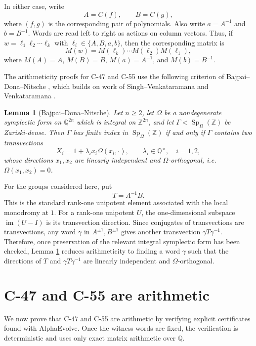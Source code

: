 \documentclass[11pt]{article}
\newtheorem{lemma}{Lemma}
\DeclareMathOperator{\Sp}{Sp}
\newcommand{\ZZ}{\mathbb{Z}}
\newcommand{\QQ}{\mathbb{Q}}
\begin{document}
In either case, write
\[
  A=C(f),\qquad B=C(g),
\]
where $(f,g)$ is the corresponding pair of polynomials.  Also write
$a=A^{-1}$ and $b=B^{-1}$.  Words are read left to right as actions on column
vectors.  Thus, if $w=\ell_1\ell_2\cdots\ell_k$ with
$\ell_i\in\{A,B,a,b\}$, then the corresponding matrix is
\[
  M(w)=M(\ell_k)\cdots M(\ell_2)M(\ell_1),
\]
where $M(A)=A$, $M(B)=B$, $M(a)=A^{-1}$, and $M(b)=B^{-1}$.

The arithmeticity proofs for C-47 and C-55 use the following criterion of Bajpai--Dona--Nitsche
\cite[Lemma 1]{BajpaiDonaNitsche2026Arithmetic}, which builds on work of
Singh--Venkataramana \cite{SinghVenkataramana2014Arithmeticity} and
Venkataramana \cite{Venkataramana1987Zariskidensesubgroups}.

\begin{lemma}[Bajpai--Dona--Nitsche]\label{lem:bdn}
Let $n\geq 2$, let $\Omega$ be a nondegenerate symplectic form on $\QQ^{2n}$
which is integral on $\ZZ^{2n}$, and let
$\Gamma<\Sp_{\Omega}(\ZZ)$ be Zariski-dense. Then $\Gamma$ has finite index
in $\Sp_{\Omega}(\ZZ)$ if and only if $\Gamma$ contains two transvections
\[
  X_i=1+\lambda_i x_i\Omega(x_i,\cdot),\qquad
  \lambda_i\in\QQ^\times,\quad i=1,2,
\]
whose directions $x_1,x_2$ are linearly independent and
$\Omega$-orthogonal, i.e. $\Omega(x_1,x_2)=0$.
\end{lemma}

For the groups considered here, put
\[
  T=A^{-1}B.
\]
This is the standard rank-one unipotent element associated with the local
monodromy at $1$.  For a rank-one unipotent $U$, the one-dimensional subspace
$\operatorname{im}(U-I)$ is its transvection direction.  Since conjugates of
transvections are transvections, any word $\gamma$ in $A^{\pm1},B^{\pm1}$
gives another transvection $\gamma T\gamma^{-1}$.  Therefore, once
preservation of the relevant integral symplectic form has been checked,
Lemma \ref{lem:bdn} reduces arithmeticity to finding a word $\gamma$ such
that the directions of $T$ and $\gamma T\gamma^{-1}$ are linearly independent
and $\Omega$-orthogonal.

\section{C-47 and C-55 are arithmetic}

We now prove that C-47 and C-55 are arithmetic by verifying explicit
certificates found with AlphaEvolve.  Once the witness words are fixed, the
verification is deterministic and uses only exact matrix arithmetic over $\QQ$.
\end{document}
